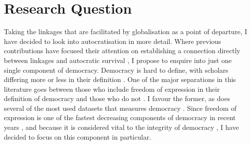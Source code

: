 \section{Research Question}
Taking the linkages that are facilitated by globalisation as a point of departure, I have decided to look into autocratisation in more detail. Where previous contributions have focused their attention on establishing a connection directly between linkages and autocratic survival \citep{bader_china_2015, tansey_ties_2017}, I propose to enquire into just one single component of democracy. Democracy is hard to define, with scholars differing more or less in their definition \citep{dahl_polyarchy_1971, dahl_democracy_1989, przeworski_democracy_1991, schumpeter_capitalism_2010}. One of the major separations in this literature goes between those who include freedom of expression in their definition of democracy \citep{dahl_polyarchy_1971} and those who do not \citep{przeworski_democracy_1991, schumpeter_capitalism_2010}. I favour the former, as does several of the most used datasets that measures democracy \citep{economist_intelligence_unit_democracy_2024, freedom_house_freedom_2024, marshall_polity5_2020, coppedge_v-dem_2024-1}. Since freedom of expression is one of the fastest decreasing components of democracy in recent years \citep{nord_democracy_2025}, and because it is considered vital to the integrity of democracy \citep{dahl_polyarchy_1971}, I have decided to focus on this component in particular.  

